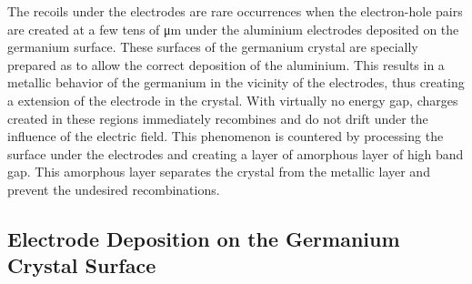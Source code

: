

The recoils under the electrodes are rare occurrences when the electron-hole pairs are created at a few tens of \si{\micro\m} under the aluminium electrodes deposited on the germanium surface. These surfaces of the germanium crystal are specially prepared as to allow the correct deposition of the aluminium. This results in a metallic behavior of the germanium in the vicinity of the electrodes, thus creating a extension of the electrode in the crystal. With virtually no energy gap, charges created in these regions immediately recombines and do not drift under the influence of the electric field. This phenomenon is countered by processing the surface under the electrodes and creating a layer of amorphous layer of high band gap. This amorphous layer separates the crystal from the metallic layer and prevent the undesired recombinations.


\subsection{Electrode Deposition on the Germanium Crystal Surface}
\label{par:aluminium-deposition}


